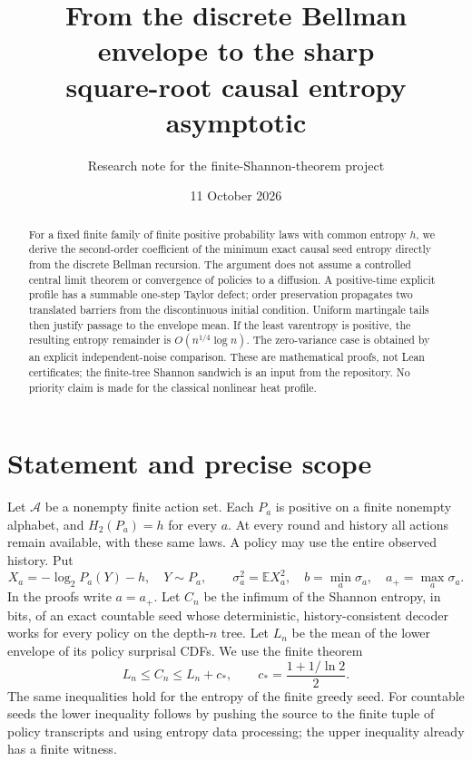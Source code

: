 \documentclass[10pt,a4paper]{article}
\title{From the discrete Bellman envelope to the sharp\texorpdfstring{\\}{ }square-root causal entropy asymptotic}
\author{Research note for the finite-Shannon-theorem project}
\date{11 October 2026}
\newcommand{\E}{\mathbb E}
\newcommand{\cstar}{c_*}
\begin{document}
\maketitle
\begin{abstract}
For a fixed finite family of finite positive probability laws with common
entropy $h$, we derive the second-order coefficient of the minimum exact
causal seed entropy directly from the discrete Bellman recursion. The argument
does not assume a controlled central limit theorem or convergence of policies
to a diffusion. A positive-time explicit profile has a summable one-step
Taylor defect; order preservation propagates two translated barriers from the
discontinuous initial condition. Uniform martingale tails then justify passage
to the envelope mean. If the least varentropy is positive, the resulting
entropy remainder is $O(n^{1/4}\log n)$. The zero-variance case is obtained by
an explicit independent-noise comparison. These are mathematical proofs,
not Lean certificates; the finite-tree Shannon sandwich is an input from the
repository. No priority claim is made for the classical nonlinear heat profile.
\end{abstract}

\section{Statement and precise scope}
Let $\mathcal A$ be a nonempty finite action set. Each $P_a$ is positive on a
finite nonempty alphabet, and $H_2(P_a)=h$ for every $a$. At every round and
history all actions remain available, with these same laws. A policy may use
the entire observed history. Put
\[
 X_a=-\log_2 P_a(Y)-h,\quad Y\sim P_a,\qquad
 \sigma_a^2=\E X_a^2,\quad
 b=\min_a\sigma_a,\quad a_+=\max_a\sigma_a.
\]
In the proofs write $a=a_+$. Let $C_n$ be the infimum of the Shannon entropy,
in bits, of an exact countable seed whose deterministic, history-consistent
decoder works for every policy on the depth-$n$ tree. Let $L_n$ be the mean
of the lower envelope of its policy surprisal CDFs. We use the finite theorem
\begin{equation}\label{sandwich}
 L_n\le C_n\le L_n+\cstar,\qquad
 \cstar=\frac{1+1/\ln 2}{2}.
\end{equation}
The same inequalities hold for the entropy of the finite greedy seed.
For countable seeds the lower inequality follows by pushing the source to
the finite tuple of policy transcripts and using entropy data processing;
the upper inequality already has a finite witness.
\end{document}
